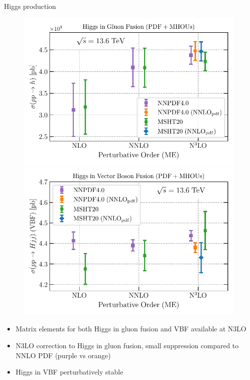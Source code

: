 \documentclass[8pt,t]{beamer}
\begin{document}
\begin{frame}{Higgs production}
  \begin{figure}[!t]
    \centering
    \includegraphics[width=0.49\linewidth]{figures/higgs-ggF-n3lo.pdf}
    \includegraphics[width=0.49\linewidth]{figures/H_VBF-n3lo.pdf}
  \end{figure}
  \begin{itemize}
    \item Matrix elements for both Higgs in gluon fusion and VBF available at N3LO
    \item N3LO correction to Higgs in gluon fusion, small suppression compared to NNLO PDF (purple vs orange)
    \item Higgs in VBF perturbatively stable
  \end{itemize}
\end{frame}
\end{document}
